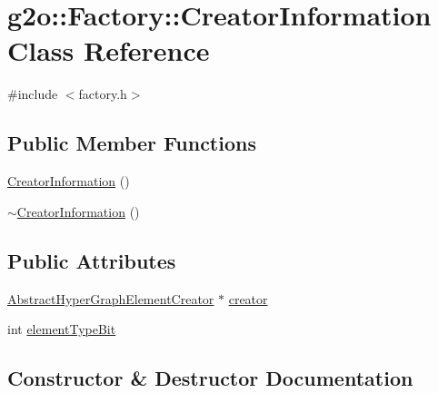 \hypertarget{classg2o_1_1_factory_1_1_creator_information}{}\section{g2o\+:\+:Factory\+:\+:Creator\+Information Class Reference}
\label{classg2o_1_1_factory_1_1_creator_information}


{\ttfamily \#include $<$factory.\+h$>$}

\subsection*{Public Member Functions}
\begin{DoxyCompactItemize}
\item 
\mbox{\hyperlink{classg2o_1_1_factory_1_1_creator_information_a8f4353b17f6548b0c935a4062231d968}{Creator\+Information}} ()
\item 
\mbox{\hyperlink{classg2o_1_1_factory_1_1_creator_information_a5f29790696c1143395a4e11f4bb372c1}{$\sim$\+Creator\+Information}} ()
\end{DoxyCompactItemize}
\subsection*{Public Attributes}
\begin{DoxyCompactItemize}
\item 
\mbox{\hyperlink{classg2o_1_1_abstract_hyper_graph_element_creator}{Abstract\+Hyper\+Graph\+Element\+Creator}} $\ast$ \mbox{\hyperlink{classg2o_1_1_factory_1_1_creator_information_a9fd5a1087992c17f869f1d59bc519c23}{creator}}
\item 
int \mbox{\hyperlink{classg2o_1_1_factory_1_1_creator_information_ab9fa4c8aec27d204f5ae6a7510c4e339}{element\+Type\+Bit}}
\end{DoxyCompactItemize}


\subsection{Constructor \& Destructor Documentation}
\mbox{\label{classg2o_1_1_factory_1_1_creator_information_a8f4353b17f6548b0c935a4062231d968}} 
